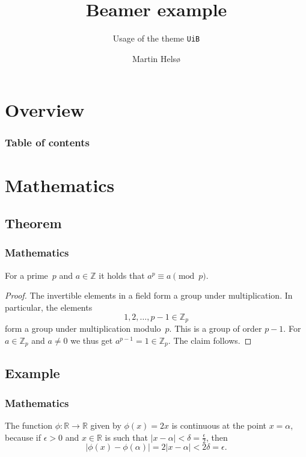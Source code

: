 \documentclass[UKenglish]{beamer}
\author{Martin Helsø}
\title{Beamer example}
\subtitle{Usage of the theme \texttt{UiB}}
\begin{document}
\section{Overview}
%
%
\begin{frame}
    \frametitle{Table of contents}
    \tableofcontents[currentsection]
\end{frame}

\section{Mathematics}
\subsection{Theorem}

\begin{frame}
    \frametitle{Mathematics}

    \begin{theorem}
        For a prime~\(p\) and \(a \in \mathbb{Z}\) it holds that \(a^p \equiv a \pmod{p}\).
    \end{theorem}

    \begin{proof}
        The invertible elements in a field form a group under multiplication.
        In particular, the elements
        \begin{equation*}
            1, 2, \ldots, p - 1 \in \mathbb{Z}_p
        \end{equation*}
        form a group under multiplication modulo~\(p\).
        This is a group of order \(p - 1\).
        For \(a \in \mathbb{Z}_p\) and \(a \neq 0\) we thus get \(a^{p-1} = 1 \in \mathbb{Z}_p\).
        The claim follows.
    \end{proof}
\end{frame}

\subsection{Example}

\begin{frame}
    \frametitle{Mathematics}

    \begin{example}
        The function \(\phi \colon \mathbb{R} \to \mathbb{R}\) given by \(\phi(x) = 2x\) is continuous at the point \(x = \alpha\),
        because if \(\epsilon > 0\) and \(x \in \mathbb{R}\) is such that \(\lvert x - \alpha \rvert < \delta = \frac{\epsilon}{2}\),
        then
        \begin{equation*}
            \lvert \phi(x) - \phi(\alpha)\rvert = 2\lvert x - \alpha \rvert < 2\delta = \epsilon.
        \end{equation*}
    \end{example}
\end{frame}
\end{document}
